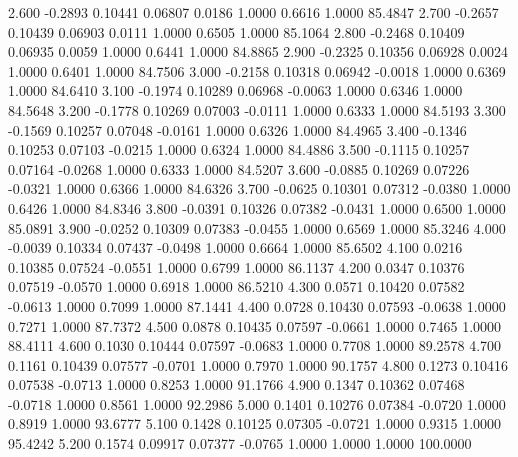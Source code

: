   2.600  -0.2893   0.10441   0.06807   0.0186   1.0000   0.6616   1.0000  85.4847
   2.700  -0.2657   0.10439   0.06903   0.0111   1.0000   0.6505   1.0000  85.1064
   2.800  -0.2468   0.10409   0.06935   0.0059   1.0000   0.6441   1.0000  84.8865
   2.900  -0.2325   0.10356   0.06928   0.0024   1.0000   0.6401   1.0000  84.7506
   3.000  -0.2158   0.10318   0.06942  -0.0018   1.0000   0.6369   1.0000  84.6410
   3.100  -0.1974   0.10289   0.06968  -0.0063   1.0000   0.6346   1.0000  84.5648
   3.200  -0.1778   0.10269   0.07003  -0.0111   1.0000   0.6333   1.0000  84.5193
   3.300  -0.1569   0.10257   0.07048  -0.0161   1.0000   0.6326   1.0000  84.4965
   3.400  -0.1346   0.10253   0.07103  -0.0215   1.0000   0.6324   1.0000  84.4886
   3.500  -0.1115   0.10257   0.07164  -0.0268   1.0000   0.6333   1.0000  84.5207
   3.600  -0.0885   0.10269   0.07226  -0.0321   1.0000   0.6366   1.0000  84.6326
   3.700  -0.0625   0.10301   0.07312  -0.0380   1.0000   0.6426   1.0000  84.8346
   3.800  -0.0391   0.10326   0.07382  -0.0431   1.0000   0.6500   1.0000  85.0891
   3.900  -0.0252   0.10309   0.07383  -0.0455   1.0000   0.6569   1.0000  85.3246
   4.000  -0.0039   0.10334   0.07437  -0.0498   1.0000   0.6664   1.0000  85.6502
   4.100   0.0216   0.10385   0.07524  -0.0551   1.0000   0.6799   1.0000  86.1137
   4.200   0.0347   0.10376   0.07519  -0.0570   1.0000   0.6918   1.0000  86.5210
   4.300   0.0571   0.10420   0.07582  -0.0613   1.0000   0.7099   1.0000  87.1441
   4.400   0.0728   0.10430   0.07593  -0.0638   1.0000   0.7271   1.0000  87.7372
   4.500   0.0878   0.10435   0.07597  -0.0661   1.0000   0.7465   1.0000  88.4111
   4.600   0.1030   0.10444   0.07597  -0.0683   1.0000   0.7708   1.0000  89.2578
   4.700   0.1161   0.10439   0.07577  -0.0701   1.0000   0.7970   1.0000  90.1757
   4.800   0.1273   0.10416   0.07538  -0.0713   1.0000   0.8253   1.0000  91.1766
   4.900   0.1347   0.10362   0.07468  -0.0718   1.0000   0.8561   1.0000  92.2986
   5.000   0.1401   0.10276   0.07384  -0.0720   1.0000   0.8919   1.0000  93.6777
   5.100   0.1428   0.10125   0.07305  -0.0721   1.0000   0.9315   1.0000  95.4242
   5.200   0.1574   0.09917   0.07377  -0.0765   1.0000   1.0000   1.0000 100.0000
